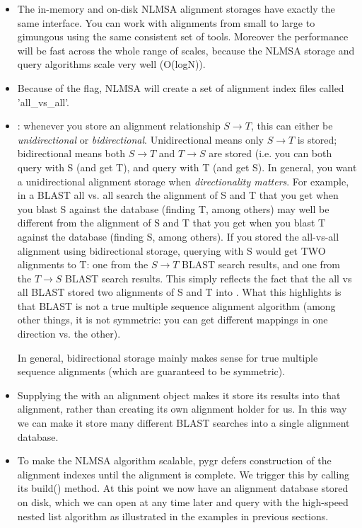 \documentclass{howto}
\begin{document}
\begin{itemize}

\item
The in-memory and on-disk NLMSA alignment storages have exactly the same
interface.  You can work with alignments from small to large to gimungous
using the same consistent set of tools.  Moreover the performance will be
fast across the whole range of scales, because the NLMSA storage and query
algorithms scale very well (O(logN)).

\item
Because of the  flag, NLMSA will create a set of alignment
index files called 'all_vs_all'.

\item 
{}: whenever you store an alignment relationship
$S \rightarrow T$, this can either be {\em unidirectional} or {\em bidirectional}.
Unidirectional means only $S \rightarrow T$ is stored; bidirectional means
both $S \rightarrow T$ and $T \rightarrow S$ are stored (i.e. you can both query
with S (and get T), and query with T (and get S).  In general, you want 
a unidirectional alignment storage when {\em directionality matters}.  For
example, in a BLAST all vs. all search the alignment of S and T that you get
when you blast S against the database (finding T, among others) may well be
different from the alignment of S and T that you get when you blast T against
the database (finding S, among others).  If you stored the all-vs-all alignment
using bidirectional storage, querying  with S would get TWO alignments 
to T: one from the $S \rightarrow T$ BLAST search results, and one from the
$T \rightarrow S$ BLAST search results.  This simply reflects the fact that 
the all vs all BLAST stored two alignments of S and T into .
What this highlights is that BLAST is not a true multiple sequence alignment
algorithm (among other things, it is not symmetric: you can get different
mappings in one direction vs. the other).  

In general, bidirectional storage
mainly makes sense for true multiple sequence alignments (which are guaranteed
to be symmetric).

\item
Supplying the  with an alignment object makes it store
its results into that alignment, rather than creating its own alignment holder
for us.  In this way we can make it store many different BLAST searches into
a single alignment database.

\item
To make the NLMSA algorithm scalable, pygr defers construction of the alignment
indexes until the alignment is complete.  We trigger this by calling its build()
method.  At this point we now have an alignment database stored on disk, which
we can open at any time later and query with the high-speed nested list algorithm
as illustrated in the examples in previous sections.

\end{itemize}
\end{document}
